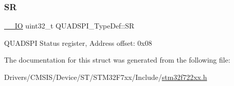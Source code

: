 \subsubsection{\texorpdfstring{SR}{SR}}
{\footnotesize\ttfamily \mbox{\hyperlink{core__sc300_8h_aec43007d9998a0a0e01faede4133d6be}{\+\_\+\+\_\+\+IO}} uint32\+\_\+t Q\+U\+A\+D\+S\+P\+I\+\_\+\+Type\+Def\+::\+SR}

Q\+U\+A\+D\+S\+PI Status register, Address offset\+: 0x08 

The documentation for this struct was generated from the following file\+:\begin{DoxyCompactItemize}
\item 
Drivers/\+C\+M\+S\+I\+S/\+Device/\+S\+T/\+S\+T\+M32\+F7xx/\+Include/\mbox{\hyperlink{stm32f722xx_8h}{stm32f722xx.\+h}}\end{DoxyCompactItemize}
